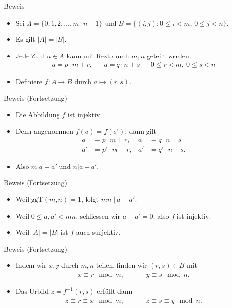 \documentclass{beamer}
\newcommand{\ggt}{\mathrm{ggT}}
\newcommand{\ue}{\"u}
\begin{document}
\begin{frame}
\begin{overprint}
\begin{block}{Beweis}
			\begin{itemize}
				\item Sei $A=\{0,1,2,\ldots,m\cdot n-1\}$ und $B=\{(i,j):0\leq i< m,\, 0\leq j< n\}$.
				\item Es gilt $|A|=|B|$.
				\item Jede Zahl $a\in A$ kann mit Rest durch $m,n$ geteilt werden:
					\begin{align*}
						a=p\cdot m+r,&&a=q\cdot n+s&&0\leq r<m,\ 0\leq s<n
					\end{align*}
				\item Definiere $f:A\to B$ durch $a\mapsto (r,s)$.
			\end{itemize}	
		\end{block}
		\begin{block}{Beweis (Fortsetzung)}
			\begin{itemize}
				\item Die Abbildung $f$ ist injektiv.
				\item Denn angenommen $f(a)=f(a')$; dann gilt
					\begin{align*}
						a&=p\cdot m+r,&a&=q\cdot n+s\\ a'&=p'\cdot m+r,&a'&=q'\cdot n+s.
					\end{align*}
				\item Also $m|a-a'$ und $n|a-a'$.
			\end{itemize}	
		\end{block}
		\begin{block}{Beweis (Fortsetzung)}
			\begin{itemize}
				\item Weil $\ggt(m,n)=1$, folgt $mn\mid a-a'$.
				\item Weil $0\leq a,a'<mn$, schliessen wir $a-a'=0$; also $f$ ist injektiv.
				\item Weil $|A|=|B|$ ist $f$ auch surjektiv.
			\end{itemize}	
		\end{block}
		\begin{block}{Beweis (Fortsetzung)}
			\begin{itemize}
				\item Indem wir $x,y$ durch $m,n$ teilen, finden wir $(r,s)\in B$ mit
					\begin{align*}
						x\equiv r\mod m,&&&&y\equiv s\mod n.
					\end{align*}
				\item Das Urbild $z=f^{-1}(r,s)$ erf\ue llt dann
					\begin{align*}
						z\equiv r\equiv x\mod m,&&&&z\equiv s\equiv y\mod n.
					\end{align*}
			\end{itemize}	
		\end{block}
	\end{overprint}
\end{frame}
\end{document}
